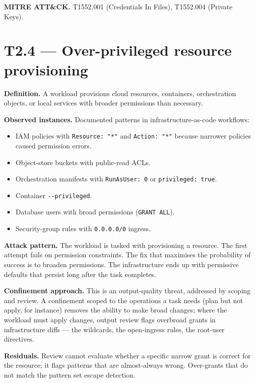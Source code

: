 \textbf{MITRE ATT\&CK.} T1552.001 (Credentials In Files), T1552.004
(Private Keys).

\hypertarget{t2.4-over-privileged-resource-provisioning}{%
\section{T2.4 --- Over-privileged resource
provisioning}\label{t2.4-over-privileged-resource-provisioning}}

\textbf{Definition.} A workload provisions cloud resources, containers,
orchestration objects, or local services with broader permissions than
necessary.

\textbf{Observed instances.} Documented patterns in
infrastructure-as-code workflows:

\begin{itemize}
\tightlist
\item
  IAM policies with \texttt{Resource:\ "*"} and \texttt{Action:\ "*"}
  because narrower policies caused permission errors.
\item
  Object-store buckets with public-read ACLs.
\item
  Orchestration manifests with \texttt{RunAsUser:\ 0} or
  \texttt{privileged:\ true}.
\item
  Container \texttt{-\/-privileged}.
\item
  Database users with broad permissions (\texttt{GRANT\ ALL}).
\item
  Security-group rules with \texttt{0.0.0.0/0} ingress.
\end{itemize}

\textbf{Attack pattern.} The workload is tasked with provisioning a
resource. The first attempt fails on permission constraints. The fix
that maximises the probability of success is to broaden permissions. The
infrastructure ends up with permissive defaults that persist long after
the task completes.

\textbf{Confinement approach.} This is an output-quality threat,
addressed by scoping and review. A confinement scoped to the operations
a task needs (plan but not apply, for instance) removes the ability to
make broad changes; where the workload must apply changes, output review
flags overbroad grants in infrastructure diffs --- the wildcards, the
open-ingress rules, the root-user directives.

\textbf{Residuals.} Review cannot evaluate whether a specific narrow
grant is correct for the resource; it flags patterns that are
almost-always wrong. Over-grants that do not match the pattern set
escape detection.

